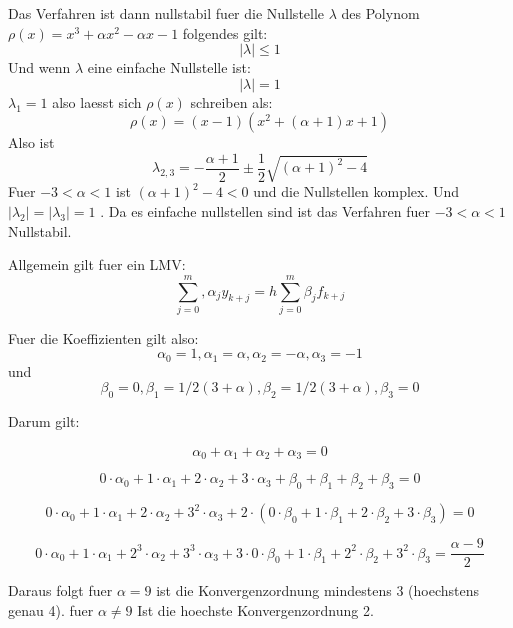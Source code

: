 \documentclass{article}
\begin{document}
Das Verfahren  ist dann nullstabil fuer die Nullstelle $\lambda$  des Polynom
$ \rho(x)= x^3 + \alpha x^2 - \alpha x -1$ folgendes gilt:
\[  | \lambda | \leq 1 \]
Und wenn $\lambda$  eine einfache Nullstelle ist:
\[  | \lambda | = 1 \]
$\lambda_1=1$ also laesst sich  $ \rho(x)$ schreiben als:
\[  \rho (x)= (x-1)(x^2+(\alpha +1)x+1) \]
Also ist 
\[   \lambda_{2,3}  = - \frac{\alpha+1}{2} \pm \frac{1}{2} 
\sqrt{(\alpha +1)^2 -4}  \]
Fuer $-3< \alpha < 1 $   ist $(\alpha +1)^2 -4 <0 $ und die Nullstellen komplex.
Und $|\lambda_2|=|\lambda_3|=1$ . Da es einfache nullstellen sind ist das Verfahren fuer
$-3< \alpha < 1 $  Nullstabil. 

Allgemein gilt fuer ein LMV:
\[
\sum_{j=0}^m ,\alpha_j y_{k+j}=h \sum_{j=0}^m \beta_j f_{k+j}
\]

Fuer die Koeffizienten gilt also:
\[ \alpha_0=1 , \alpha_1=\alpha , \alpha_2=-\alpha ,\alpha_3=-1 \]
und
\[ \beta_0=0 , \beta_1=1/2 (3+\alpha) , \beta_2=1/2 (3+\alpha),\beta_3=0 \]

Darum gilt:

\[  \alpha_0 + \alpha_1 + \alpha_2 + \alpha_3 = 0 \]

\[ 0 \cdot \alpha_0 + 1 \cdot \alpha_1 + 2 \cdot \alpha_2 + 3 \cdot \alpha_3 + \beta_0 + \beta_1 + \beta_2 + \beta_3 = 0 \]

\[ 0 \cdot \alpha_0 + 1 \cdot \alpha_1 + 2 \cdot \alpha_2 + 3^2 \cdot \alpha_3 + 2 \cdot (0 \cdot \beta_0 + 1 \cdot \beta_1 + 2 \cdot \beta_2 + 3 \cdot \beta_3 ) = 0 \]

\[ 0 \cdot \alpha_0 + 1 \cdot \alpha_1 + 2^3 \cdot \alpha_2 + 3^3 \cdot \alpha_3 + 3 \cdot 0 \cdot \beta_0 + 1 \cdot \beta_1 + 2^2 \cdot \beta_2 + 3^2 \cdot \beta_3 =  \frac{\alpha-9}{2} \]

Daraus folgt  fuer $\alpha=9$ ist die Konvergenzordnung mindestens 3 (hoechstens genau 4). fuer $\alpha \not = 9$
Ist die hoechste Konvergenzordnung 2.
\end{document}
